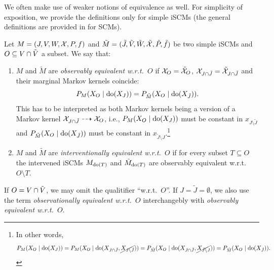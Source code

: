 We often make use of weaker notions of equivalence as well.
For simplicity of exposition, we provide the definitions only for simple iSCMs 
(the general definitions are provided in \cite{BFPM21} for SCMs).
\begin{Def}\label{def:scm_obs_interv_equiv}
  Let $M = \left ( J, V, W, \mathcal{X}, P, f \right )$ and
  $\tilde{M} = ( \tilde{J}, \tilde{V}, \tilde{W}, \tilde{\mathcal{X}}, \tilde{P}, \tilde{f} )$ be two simple iSCMs
  and $O \subseteq V \cap \tilde{V}$ a subset.
  We say that:
  \begin{enumerate}
    \item $M$ and $\tilde{M}$ are \emph{observably equivalent w.r.t.\ $O$} if $\mathcal{X}_O = \tilde{\mathcal{X}}_O$, $\mathcal{X}_{J \cap \tilde{J}} = \tilde{\mathcal{X}}_{J \cap \tilde{J}}$ and their marginal Markov kernels coincide: 
      $$P_{M}(X_O \mid \operatorname{do}(X_J)) = P_{\tilde{M}}(X_O \mid \operatorname{do}(X_{\tilde J})).$$
    This has to be interpreted as both Markov kernels being a version of a Markov kernel $\mathcal{X}_{J \cap \tilde{J}} \dashrightarrow \mathcal{X}_O$,
    i.e., $P_{M}(X_O \mid \operatorname{do}(X_J))$ must be constant in $x_{J \setminus \tilde{J}}$ and
    $P_{\tilde{M}}(X_O \mid \operatorname{do}(X_{\tilde{J}}))$ must be constant in $x_{\tilde{J} \setminus J}$.\footnote{In other words,
      $$P_{M}(X_O \mid \operatorname{do}(X_J)) = P_{M}(X_O \mid \operatorname{do}(X_{J \cap \tilde{J}},\cancel{X_{J\setminus \tilde{J}}})) =
      P_{\tilde{M}}(X_O \mid \operatorname{do}(X_{J \cap \tilde{J}},\cancel{X_{\tilde{J}\setminus J}})) = P_{\tilde{M}}(X_O \mid \operatorname{do}(X_{\tilde{J}})).$$}
    \item $M$ and $\tilde{M}$ are \emph{interventionally equivalent w.r.t.\ $O$} if for every subset $T \subseteq O$ the intervened iSCMs $M_{\operatorname{do}(T)}$ and $\tilde{M}_{\operatorname{do}(T)}$ are observably equivalent w.r.t.\ $O \setminus T$.
  \end{enumerate}
  If $O = V \cap \tilde{V}$, we may omit the qualitifier ``w.r.t.\ $O$''.
  If $J = \tilde J =  \emptyset$, we also use the term \emph{observationally equivalent w.r.t.\ $O$} interchangebly with \emph{observably equivalent w.r.t.\ $O$}.
\end{Def}
